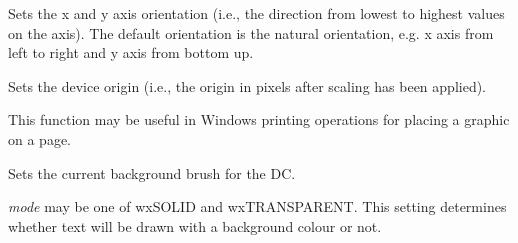 \label{wxlatexdcsetaxisorientation}


Sets the x and y axis orientation (i.e., the direction from lowest to
highest values on the axis). The default orientation is the natural
orientation, e.g. x axis from left to right and y axis from bottom up.




\label{wxlatexdcsetdeviceorigin}


Sets the device origin (i.e., the origin in pixels after scaling has been
applied).

This function may be useful in Windows printing
operations for placing a graphic on a page.

\label{wxlatexdcsetbackground}


Sets the current background brush for the DC.

\label{wxlatexdcsetbackgroundmode}


{\it mode} may be one of wxSOLID and wxTRANSPARENT. This setting determines
whether text will be drawn with a background colour or not.

\label{wxlatexdcsetclippingregion}





